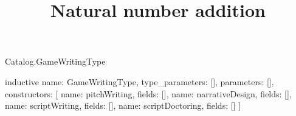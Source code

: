 \begin{lexlean}{Catalog.GameWritingType}
\title{Natural number addition}
\begin{semanticmodule}
inductive{
  name: GameWritingType,
  type_parameters: [],
  parameters: [],
  constructors: [
    {name: pitchWriting, fields: []},
    {name: narrativeDesign, fields: []},
    {name: scriptWriting, fields: []},
    {name: scriptDoctoring, fields: []}
  ]
}
\end{semanticmodule}
\end{lexlean}
